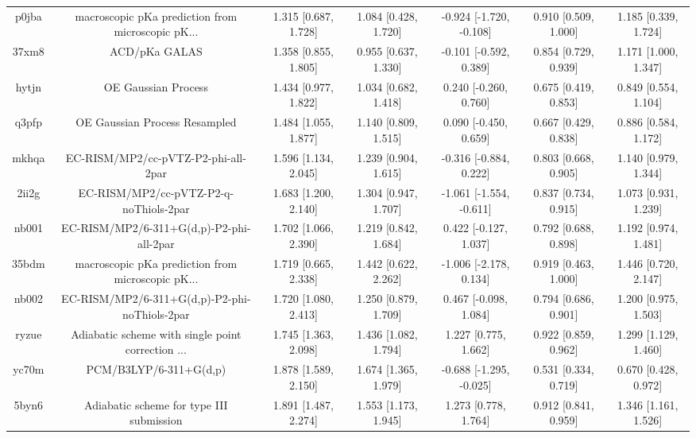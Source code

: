 \documentclass{article}
\begin{document}
\begin{center}
\begin{longtable}{|ccccccc|}
 p0jba &  macroscopic pKa prediction from microscopic pK... &  1.315 [0.687, 1.728] &  1.084 [0.428, 1.720] &  -0.924 [-1.720, -0.108] &  0.910 [0.509, 1.000] &   1.185 [0.339, 1.724] \\
 37xm8 &                                      ACD/pKa GALAS &  1.358 [0.855, 1.805] &  0.955 [0.637, 1.330] &   -0.101 [-0.592, 0.389] &  0.854 [0.729, 0.939] &   1.171 [1.000, 1.347] \\
 hytjn &                                OE Gaussian Process &  1.434 [0.977, 1.822] &  1.034 [0.682, 1.418] &    0.240 [-0.260, 0.760] &  0.675 [0.419, 0.853] &   0.849 [0.554, 1.104] \\
 q3pfp &                      OE Gaussian Process Resampled &  1.484 [1.055, 1.877] &  1.140 [0.809, 1.515] &    0.090 [-0.450, 0.659] &  0.667 [0.429, 0.838] &   0.886 [0.584, 1.172] \\
 mkhqa &                EC-RISM/MP2/cc-pVTZ-P2-phi-all-2par &  1.596 [1.134, 2.045] &  1.239 [0.904, 1.615] &   -0.316 [-0.884, 0.222] &  0.803 [0.668, 0.905] &   1.140 [0.979, 1.344] \\
 2ii2g &             EC-RISM/MP2/cc-pVTZ-P2-q-noThiols-2par &  1.683 [1.200, 2.140] &  1.304 [0.947, 1.707] &  -1.061 [-1.554, -0.611] &  0.837 [0.734, 0.915] &   1.073 [0.931, 1.239] \\
 nb001 &           EC-RISM/MP2/6-311+G(d,p)-P2-phi-all-2par &  1.702 [1.066, 2.390] &  1.219 [0.842, 1.684] &    0.422 [-0.127, 1.037] &  0.792 [0.688, 0.898] &   1.192 [0.974, 1.481] \\
 35bdm &  macroscopic pKa prediction from microscopic pK... &  1.719 [0.665, 2.338] &  1.442 [0.622, 2.262] &   -1.006 [-2.178, 0.134] &  0.919 [0.463, 1.000] &   1.446 [0.720, 2.147] \\
 nb002 &      EC-RISM/MP2/6-311+G(d,p)-P2-phi-noThiols-2par &  1.720 [1.080, 2.413] &  1.250 [0.879, 1.709] &    0.467 [-0.098, 1.084] &  0.794 [0.686, 0.901] &   1.200 [0.975, 1.503] \\
 ryzue &  Adiabatic scheme with single point correction ... &  1.745 [1.363, 2.098] &  1.436 [1.082, 1.794] &     1.227 [0.775, 1.662] &  0.922 [0.859, 0.962] &   1.299 [1.129, 1.460] \\
 yc70m &                             PCM/B3LYP/6-311+G(d,p) &  1.878 [1.589, 2.150] &  1.674 [1.365, 1.979] &  -0.688 [-1.295, -0.025] &  0.531 [0.334, 0.719] &   0.670 [0.428, 0.972] \\
 5byn6 &           Adiabatic scheme for type III submission &  1.891 [1.487, 2.274] &  1.553 [1.173, 1.945] &     1.273 [0.778, 1.764] &  0.912 [0.841, 0.959] &   1.346 [1.161, 1.526] \\

\end{longtable}
\end{center}
\end{document}
